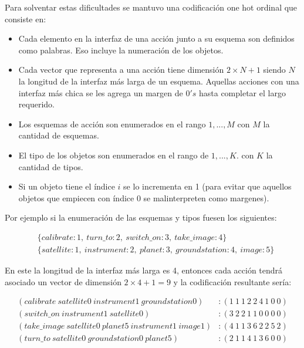 Para solventar estas dificultades se mantuvo una codificación one hot ordinal que
consiste en:

\begin{itemize}
    \item Cada elemento en la interfaz de una acción junto a su esquema son
    definidos como palabras. Eso incluye la numeración de los objetos.
    \item Cada vector que representa a una acción tiene dimensión $2 \times N +
    1$ siendo $N$ la longitud de la interfaz más larga de un esquema. Aquellas
    acciones con una interfaz más chica se les agrega un margen de $0's$ hasta
    completar el largo requerido.
    \item Los esquemas de acción son enumerados en el rango $1, ..., M$ con $M$
    la cantidad de esquemas.
    \item El tipo de los objetos son enumerados en el rango de $1, ..., K$. con
    $K$ la cantidad de tipos.
    \item Si un objeto tiene el índice $i$ se lo incrementa en 1 (para evitar que
    aquellos objetos que empiecen con índice 0 se malinterpreten como margenes).
\end{itemize}

Por ejemplo si la enumeración de las esquemas y tipos fuesen los siguientes:

\begin{align*}
    &\{calibrate: 1,\ turn\_to: 2,\ switch\_on:3,\ take\_image:4 \} \\
    &\{satellite: 1,\ instrument: 2,\ planet: 3,\ groundstation: 4,\ image: 5\}
\end{align*}

En este la longitud de la interfaz más larga es 4, entonces cada acción tendrá
asociado un vector de dimensión $2 \times 4 + 1 = 9$ y la codificación
resultante sería:

\begin{align*}
    (calibrate\ satellite0\ instrument1\ groundstation0) &: (1\ 1\ 1\ 2\ 2\ 4\ 1\ 0\ 0) \\
    (switch\_on\ instrument1\ satellite0) &: (3\ 2\ 2\ 1\ 1\ 0\ 0\ 0\ 0) \\
    (take\_image\ satellite0\ planet5\ instrument1\ image1) &: (4\ 1\ 1\ 3\ 6\ 2\ 2\ 5\ 2) \\
    (turn\_to\ satellite0\ groundstation0\ planet5) &: (2\ 1\ 1\ 4\ 1\ 3\ 6\ 0\ 0) \\
\end{align*}

